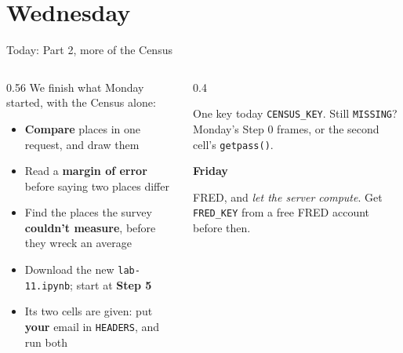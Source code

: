 \documentclass[9pt,aspectratio=169]{beamer}
\begin{document}
\section{Wednesday}

\begin{frame}{Today: Part 2, more of the Census}
    \begin{columns}[T]
        \begin{column}{0.56\textwidth}
            We finish what Monday started, with the Census alone:
            \begin{itemize}\small
                \item \textbf{Compare} places in one request, and draw them
                \item Read a \textbf{margin of error} before saying two places differ
                \item Find the places the survey \textbf{couldn't measure}, before they wreck an average
            \end{itemize}

            \medskip
            \begin{itemize}\small
                \item Download the new \texttt{lab-11.ipynb}; start at \textbf{Step 5}
                \item Its two cells are given: put \textbf{your} email in \texttt{HEADERS}, and run both
            \end{itemize}
        \end{column}
        \begin{column}{0.4\textwidth}
            \begin{alertblock}{One key today}
                \footnotesize \texttt{CENSUS\_KEY}. Still \texttt{MISSING}? Monday's Step 0 frames, or the second cell's \texttt{getpass()}.
            \end{alertblock}
            \textbf{Friday}\\[2pt]
            {\footnotesize FRED, and \textit{let the server compute}. Get \texttt{FRED\_KEY} from a free FRED account before then.\par}
        \end{column}
    \end{columns}
\end{frame}
\end{document}
